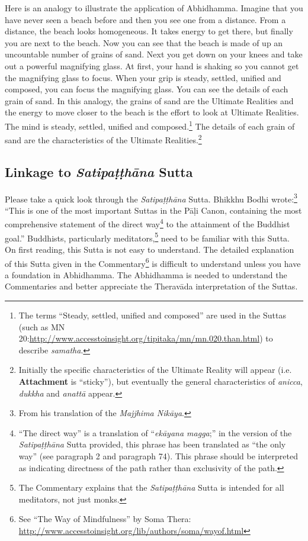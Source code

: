 Here is an analogy to illustrate the application of Abhidhamma. Imagine that you have never seen a beach before and then you see one from a distance. From a distance, the beach looks homogeneous. It takes energy to get there, but finally you are next to the beach. Now you can see that the beach is made of up an uncountable number of grains of sand. Next you get down on your knees and take out a powerful magnifying glass. At first, your hand is shaking so you cannot get the magnifying glass to focus. When your grip is steady, settled, unified and composed, you can focus the magnifying glass. You can see the details of each grain of sand. In this analogy, the grains of sand are the Ultimate Realities and the energy to move closer to the beach is the effort to look at Ultimate Realities. The mind is steady, settled, unified and composed.\footnote{The terms “Steady, settled, unified and composed” are used in the Suttas (such as MN 20:\newline \url{http://www.accesstoinsight.org/tipitaka/mn/mn.020.than.html}) to describe \textit{samatha}.} The details of each grain of sand are the characteristics of the Ultimate Realities.\footnote{Initially the specific characteristics of the Ultimate Reality will appear (i.e. \textbf{Attachment} is “sticky”), but eventually the general characteristics of \textit{anicca}, \textit{dukkha} and \textit{anattā} appear.}

\subsection*{Linkage to \textit{Satipaṭṭhāna} Sutta}

Please take a quick look through the \textit{Satipaṭṭhāna} Sutta. Bhikkhu Bodhi wrote:\footnote{From his translation of the \textit{Majjhima Nikāya}.} “This is one of the most important Suttas in the Pāḷi Canon, containing the most comprehensive statement of the direct way\footnote{“The direct way” is a translation of “\textit{ekāyana magga};” in the version of the \textit{Satipaṭṭhāna} Sutta provided, this phrase has been translated as “the only way” (see paragraph 2 and paragraph 74). This phrase should be interpreted as indicating directness of the path rather than exclusivity of the path.} to the attainment of the Buddhist goal.” Buddhists, particularly meditators,\footnote{The Commentary explains that the \textit{Satipaṭṭhāna} Sutta is intended for all meditators, not just monks.} need to be familiar with this Sutta. On first reading, this Sutta is not easy to understand. The detailed explanation of this Sutta given in the Commentary\footnote{See “The Way of Mindfulness” by Soma Thera: \url{http://www.accesstoinsight.org/lib/authors/soma/wayof.html}} is difficult to understand unless you have a foundation in Abhidhamma. The Abhidhamma is needed to understand the Commentaries and better appreciate the Theravāda interpretation of the Suttas.

